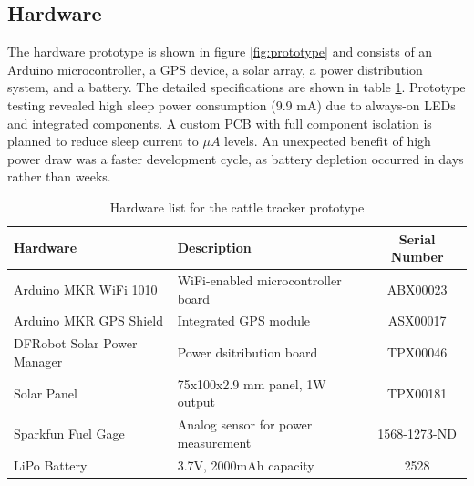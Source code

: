 \documentclass[10pt]{cai}
\begin{document}
\subsection{Hardware}
The hardware prototype is shown in figure \ref{fig:prototype} and consists of an Arduino microcontroller, a GPS device, a solar array, a power distribution system, and a battery.
The detailed specifications are shown in table \ref{tab:hardware_inventory}. 
Prototype testing revealed high sleep power consumption (9.9 mA) due to always-on LEDs and integrated components. 
A custom PCB with full component isolation is planned to reduce sleep current to $\mu A$ levels.
An unexpected benefit of high power draw was a faster development cycle, as battery depletion occurred in days rather than weeks.

\begin{table}[h]
  \centering
  \caption{Hardware list for the cattle tracker prototype}
  \begin{tabular}{l p{6.5cm} c}
      \toprule
      \textbf{Hardware} & \textbf{Description} & \textbf{Serial Number} \\
      \midrule
      Arduino MKR WiFi 1010 & WiFi-enabled microcontroller board & ABX00023 \\
      Arduino MKR GPS Shield & Integrated GPS module & ASX00017 \\
      DFRobot Solar Power Manager & Power dsitribution board & TPX00046 \\
      Solar Panel & 75x100x2.9 mm panel, 1W output & TPX00181 \\
      Sparkfun Fuel Gage & Analog sensor for power measurement & 1568-1273-ND \\
      LiPo Battery & 3.7V, 2000mAh capacity & 2528 \\
      \bottomrule
  \end{tabular}
  \label{tab:hardware_inventory}
\end{table}
\end{document}
